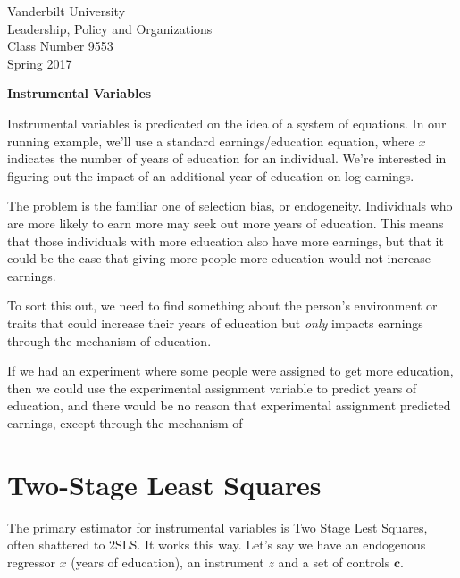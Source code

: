 \documentclass[12 pt]{article}
\begin{document}
\thispagestyle{empty}%


\setmarginsrb{1in}{.5in}{.1in}{.5in}{0pt}{0mm}{0pt}{0mm}%

\setlength{\parskip}{1ex plus 0.5ex minus 0.2ex}

\setcounter{secnumdepth}{-2}



\begin{flushleft}
Vanderbilt University\\Leadership, Policy and Organizations\\Class Number 9553\\ Spring 2017
\end{flushleft}

\begin{center}
\textbf{Instrumental Variables}
\end{center}

Instrumental variables is predicated on the idea of a system of
equations. In our running example, we'll use a standard
earnings/education equation, where $x$ indicates the number of years
of education for an individual. We're interested in figuring out the
impact of an additional year of education on log earnings. 

The problem is the familiar one of selection bias, or
endogeneity. Individuals who are more likely to earn more may seek out
more years of education. This means that those individuals with more
education also have more earnings, but that it could be the case  
that giving more people more education would not increase earnings. 

To sort this out, we need to find something about the person's
environment or traits that could increase their years of education but
\textit{only} impacts earnings through the mechanism of education. 

If we had an experiment where some people were assigned to get more
education, then we could use the experimental assignment variable to
predict years of education, and there would be no reason that
experimental assignment predicted earnings, except through the
mechanism of 

\section{Two-Stage Least Squares}
\label{sec:two-stage-least}

The primary estimator for instrumental variables is Two Stage Lest
Squares, often shattered to 2SLS. It works this way. Let's say we have
an endogenous regressor $x$ (years of education), an instrument $z$ and a
set of controls $\boldsymbol{c}$.
\end{document}
